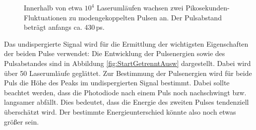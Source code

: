 \documentclass[bachelor,       %
               twoside,        %
               BCOR10mm,       %
               liststotoc,nomtotoc,bibtotoc, %
               english,ngerman, %
               final,          %
               ]{GAUBM}
\begin{document}
\begin{figure}[!htb]
   \centering
   \hfill
   \caption{Innerhalb von etwa $10^4$ Laserumläufen wachsen zwei Pikosekunden-Fluktuationen zu modengekoppelten Pulsen an.
   Der Pulsabstand beträgt anfangs ca. 430\,ps.}
   \label{fig:StartGetrennt}
\end{figure}
Das undispergierte Signal wird für die Ermittlung der wichtigsten Eigenschaften der beiden Pulse  verwendet: Die Entwicklung der Pulsenergien sowie des Pulsabstandes sind in Abbildung \ref{fig:StartGetrenntAusw} dargestellt.
Dabei wird über 50 Laserumläufe geglättet.
Zur Bestimmung der Pulsenergien wird für beide Puls die Höhe des Peaks im undispergierten Signal bestimmt.
Dabei sollte beachtet werden, dass die Photodiode nach einem Puls noch nachschwingt bzw. langsamer abfällt.
Dies bedeutet, dass die Energie des zweiten Pulses tendenziell überschätzt wird.
Der bestimmte Energieunterschied könnte also noch etwas größer sein.
\end{document}
